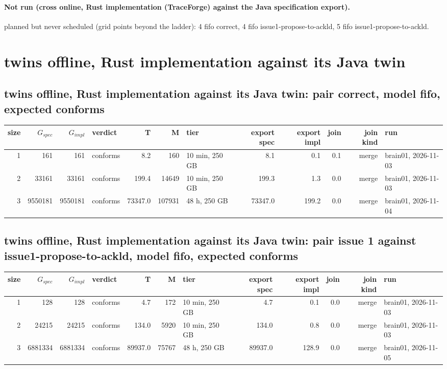\documentclass[10pt]{article}
\begin{document}
\paragraph{Not run (cross online, Rust implementation (TraceForge) against the Java specification export).}
planned but never scheduled (grid points beyond the ladder): 4 fifo correct, 4 fifo issue1-propose-to-ackld, 5 fifo issue1-propose-to-ackld.\par
\section*{twins offline, Rust implementation against its Java twin}
\subsection*{twins offline, Rust implementation against its Java twin: pair \textsf{correct}, model fifo, expected conforms}
\begin{longtable}{@{}rrrlrrlrrrrl@{}}
\toprule
size & $G_{\mathit{spec}}$ & $G_{\mathit{impl}}$ & verdict & T & M & tier & export spec & export impl & join & join kind & run \\
\midrule
\endhead
\color{blue} 1 & 161 & 161 & conforms & 8.2 & 160 & 10 min, 250 GB & 8.1 & 0.1 & 0.1 & merge & brain01, 2026-11-03 \\
\color{blue} 2 & 33161 & 33161 & conforms & 199.4 & 14649 & 10 min, 250 GB & 199.3 & 1.3 & 0.0 & merge & brain01, 2026-11-03 \\
\color{blue} 3 & 9550181 & 9550181 & conforms & 73347.0 & 107931 & 48 h, 250 GB & 73347.0 & 199.2 & 0.0 & merge & brain01, 2026-11-04 \\
\bottomrule
\end{longtable}
\subsection*{twins offline, Rust implementation against its Java twin: pair \textsf{issue 1} against \textsf{issue1-propose-to-ackld}, model fifo, expected conforms}
\begin{longtable}{@{}rrrlrrlrrrrl@{}}
\toprule
size & $G_{\mathit{spec}}$ & $G_{\mathit{impl}}$ & verdict & T & M & tier & export spec & export impl & join & join kind & run \\
\midrule
\endhead
\color{blue} 1 & 128 & 128 & conforms & 4.7 & 172 & 10 min, 250 GB & 4.7 & 0.1 & 0.0 & merge & brain01, 2026-11-03 \\
\color{blue} 2 & 24215 & 24215 & conforms & 134.0 & 5920 & 10 min, 250 GB & 134.0 & 0.8 & 0.0 & merge & brain01, 2026-11-03 \\
\color{blue} 3 & 6881334 & 6881334 & conforms & 89937.0 & 75767 & 48 h, 250 GB & 89937.0 & 128.9 & 0.0 & merge & brain01, 2026-11-05 \\
\bottomrule
\end{longtable}
\end{document}
